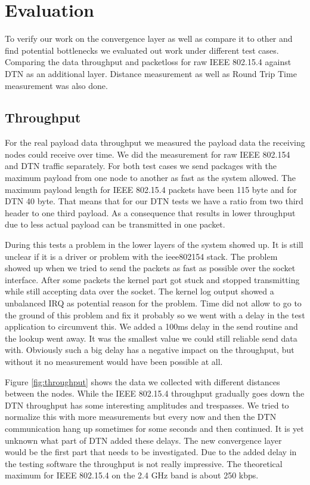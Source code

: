 \chapter{Evaluation}
To verify our work on the convergence layer as well as compare it to other and
find potential bottlenecks we evaluated out work under different test cases.
Comparing the data throughput and packetloss for raw IEEE 802.15.4 against DTN
as an additional layer. Distance measurement as well as Round Trip Time
measurement was also done.

\section{Throughput}
For the real payload data throughput we measured the payload data the receiving
nodes could receive over time. We did the measurement for raw IEEE 802.154 and
DTN traffic separately. For both test cases we send packages with the maximum
payload from one node to another as fast as the system allowed. The maximum
payload length for IEEE 802.15.4 packets have been 115 byte and for DTN 40 byte.
That means that for our DTN tests we have a ratio from two third header to one
third payload. As a consequence that results in lower throughput due to less
actual payload can be transmitted in one packet.

During this tests a problem in the lower layers of the system showed up. It is
still unclear if it is a driver or problem with the ieee802154 stack. The
problem showed up when we tried to send the packets as fast as possible over the
socket interface. After some packets the kernel part got stuck and stopped
transmitting while still accepting data over the socket. The kernel log output
showed a unbalanced IRQ as potential reason for the problem. Time did not allow
to go to the ground of this problem and fix it probably so we went with a delay
in the test application to circumvent this. We added a 100ms delay in the send
routine and the lookup went away. It was the smallest value we could still
reliable send data with. Obviously such a big delay has a negative impact on the
throughput, but without it no measurement would have been possible at all.

Figure \ref{fig:throughput} shows the data we collected with different distances between the
nodes. While the IEEE 802.15.4 throughput gradually goes down the DTN throughput
has some interesting amplitudes and trespasses. We tried to normalize this with
more measurements but every now and then the DTN communication hang up sometimes
for some seconds and then continued. It is yet unknown what part of DTN added
these delays. The new convergence layer would be the first part that needs to be
investigated. Due to the added delay in the testing software the throughput is
not really impressive. The theoretical maximum for IEEE 802.15.4 on the 2.4 GHz
band is about 250 kbps.

